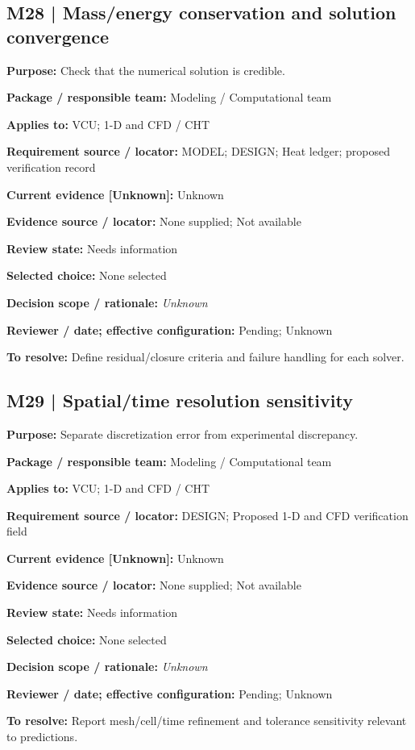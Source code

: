 \documentclass[11pt]{article}
\begin{document}
\begin{minipage}{\textwidth}\small\setlength{\parskip}{2pt}
\subsection*{M28 | Mass/energy conservation and solution convergence}
\textbf{Purpose:} Check that the numerical solution is credible.\par
\textbf{Package / responsible team:} Modeling / Computational team\par
\textbf{Applies to:} VCU; 1-D and CFD / CHT\par
\textbf{Requirement source / locator:} MODEL; DESIGN; Heat ledger; proposed verification record\par
\textbf{Current evidence [Unknown]:} Unknown\par
\textbf{Evidence source / locator:} None supplied; Not available\par
\textbf{Review state:} Needs information\par
\textbf{Selected choice:} None selected\par
\textbf{Decision scope / rationale:} \textit{Unknown}\par
\textbf{Reviewer / date; effective configuration:} Pending; Unknown\par
\textbf{To resolve:} Define residual/closure criteria and failure handling for each solver.\par
\end{minipage}\par\vspace{5pt}
\begin{minipage}{\textwidth}\small\setlength{\parskip}{2pt}
\subsection*{M29 | Spatial/time resolution sensitivity}
\textbf{Purpose:} Separate discretization error from experimental discrepancy.\par
\textbf{Package / responsible team:} Modeling / Computational team\par
\textbf{Applies to:} VCU; 1-D and CFD / CHT\par
\textbf{Requirement source / locator:} DESIGN; Proposed 1-D and CFD verification field\par
\textbf{Current evidence [Unknown]:} Unknown\par
\textbf{Evidence source / locator:} None supplied; Not available\par
\textbf{Review state:} Needs information\par
\textbf{Selected choice:} None selected\par
\textbf{Decision scope / rationale:} \textit{Unknown}\par
\textbf{Reviewer / date; effective configuration:} Pending; Unknown\par
\textbf{To resolve:} Report mesh/cell/time refinement and tolerance sensitivity relevant to predictions.\par
\end{minipage}\par\vspace{5pt}
\end{document}
